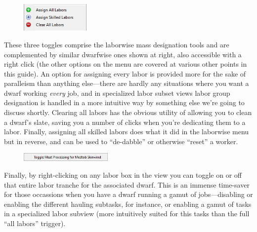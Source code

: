 \documentclass[]{article}
\begin{document}
\begin{figure}
\vspace{-20pt}
  \begin{center}
    \includegraphics[width=0.3\textwidth]{Sec2Fig5-2}
  \end{center}
\vspace{-10pt}
\end{figure}
These three toggles comprise the laborwise mass designation tools and are complemented by similar
dwarfwise ones shown at right, also accessible with a right click (the other options on the menu are
covered at various other points in this guide). An option for assigning every labor is provided more for
the sake of paralleism than anything else---there are hardly any situations where you want a dwarf
working \emph{every} job, and in specialized labor subset views labor group designation is handled in a
more intuitive way by something else we're going to discuss shortly. Clearing all labors has the obvious
utility of allowing you to clean a dwarf's slate, saving you a number of clicks when you're dedicating
them to a labor. Finally, assigning all skilled labors does what it did in the laborwise menu but in
reverse, and can be used to ``de-dabble'' or otherwise ``reset'' a worker.

\begin{figure}
\vspace{-20pt}
  \begin{center}
    \includegraphics[width=0.4\textwidth]{Sec2Fig5-4}
  \end{center}
\vspace{-10pt}
\end{figure}
Finally, by right-clicking on any labor box in the view you can toggle on or off that entire labor
tranche for the associated dwarf. This is an immense time-saver for those occassions when you have a
dwarf running a gamut of jobs---disabling or enabling the different hauling subtasks, for instance, or
enabling a gamut of tasks in a specialized labor subview (more intuitively suited for this tasks than
the full ``all labors'' trigger).
\end{document}
